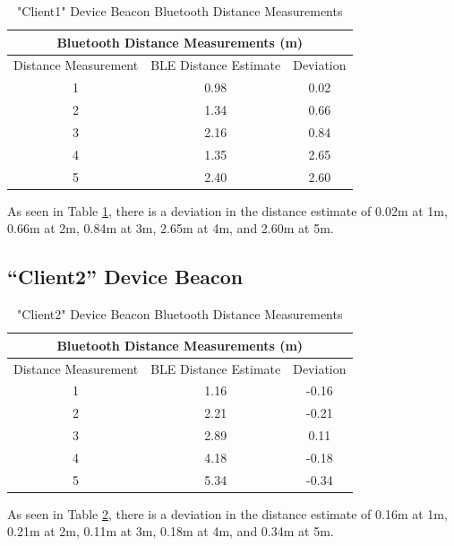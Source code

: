 \documentclass[11pt,a4paper,headinclude=false,footinclude=false]{scrreprt}
\begin{document}
\begin{table}[H]
\centering
    \begin{tabular}{||c|c|c||}
    \hline
    \multicolumn{3}{|c|}{\textbf{Bluetooth Distance Measurements (m)}} \\
    \hline\hline
    Distance Measurement & BLE Distance Estimate & Deviation \\
    \hline
    1 & 0.98 & 0.02 \\
    \hline
    2 & 1.34 & 0.66 \\
    \hline
    3 & 2.16 & 0.84 \\
    \hline
    4 & 1.35 & 2.65 \\
    \hline
    5 & 2.40 & 2.60 \\
    \hline\hline
    \end{tabular}
    \caption{"Client1" Device Beacon Bluetooth Distance Measurements}
    \label{client1BLEmeasurement}
\end{table}

As seen in Table \ref{client1BLEmeasurement}, there is a deviation in
the distance estimate of 0.02m at 1m, 0.66m at 2m, 0.84m at 3m, 2.65m at
4m, and 2.60m at 5m.

\subsection{\texorpdfstring{``Client2'' Device
Beacon}{Client2 Device Beacon}}\label{client2-device-beacon}

\begin{table}[H]
\centering
    \begin{tabular}{||c|c|c||}
    \hline
    \multicolumn{3}{|c|}{\textbf{Bluetooth Distance Measurements (m)}} \\
    \hline\hline
    Distance Measurement & BLE Distance Estimate & Deviation \\
    \hline
    1 & 1.16 & -0.16 \\
    \hline
    2 & 2.21 & -0.21 \\
    \hline
    3 & 2.89 & 0.11 \\
    \hline
    4 & 4.18 & -0.18 \\
    \hline
    5 & 5.34 & -0.34 \\
    \hline\hline
    \end{tabular}
    \caption{"Client2" Device Beacon Bluetooth Distance Measurements}
    \label{client2BLEmeasurement}
\end{table}

As seen in Table \ref{client2BLEmeasurement}, there is a deviation in
the distance estimate of 0.16m at 1m, 0.21m at 2m, 0.11m at 3m, 0.18m at
4m, and 0.34m at 5m.
\end{document}
